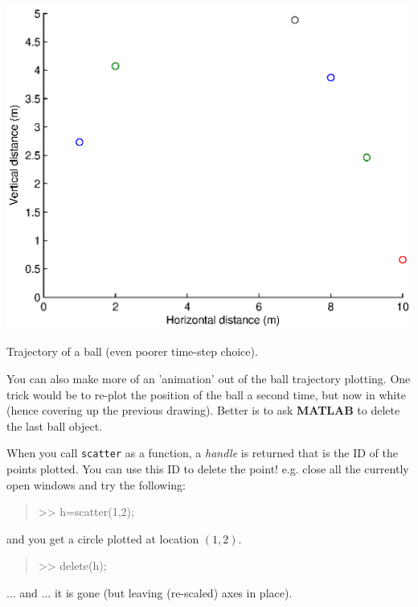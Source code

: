 \documentclass{tufte-book} %
\newenvironment{docspec}{\begin{quotation}\ttfamily\parskip0pt\parindent0pt\ignorespaces}{\end{quotation}}
\begin{document}
\begin{marginfigure}[-0.25in]
\includegraphics[width=\linewidth]{ch9-ball_uv3.eps}
\caption{Trajectory of a ball (even poorer time-step choice).}
\label{fig:ch9-ball_uv3}
\end{marginfigure}

\vspace{1mm}

You can also make more of an 'animation' out of the ball trajectory plotting. One trick would be to re-plot the position of the ball a second time, but now in white (hence covering up the previous drawing). Better is to ask \textbf{MATLAB} to delete the last ball object.

When you call \texttt{scatter} as a function, a \textit{handle} is returned that is the ID of the points plotted. You can use this ID to delete the point! e.g. close all the currently open windows and try the following:
\begin{docspec}
>> h=scatter(1,2);
\end{docspec}
and you get a circle plotted at location \((1,2)\).
\begin{docspec}
>> delete(h);
\end{docspec}
... and ... it is gone (but leaving (re-scaled) axes in place).
\end{document}
